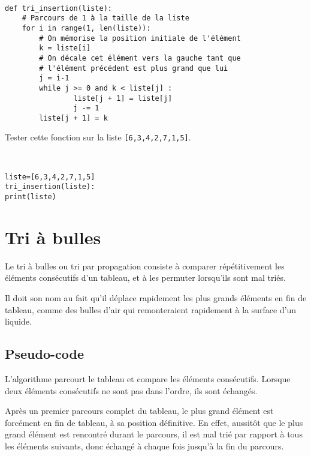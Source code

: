 \begin{solution}~\\
\vspace{-0.7cm}
\begin{verbatim}
def tri_insertion(liste): 
    # Parcours de 1 à la taille de la liste
    for i in range(1, len(liste)):
        # On mémorise la position initiale de l'élément
        k = liste[i]
        # On décale cet élément vers la gauche tant que
        # l'élément précédent est plus grand que lui
        j = i-1
        while j >= 0 and k < liste[j] : 
                liste[j + 1] = liste[j] 
                j -= 1
        liste[j + 1] = k
\end{verbatim}    
\end{solution}

\begin{exercice}
Tester cette fonction sur la liste \verb?[6,3,4,2,7,1,5]?.
\end{exercice}

\begin{solution}~\\
\vspace{-0.7cm}
\begin{verbatim}
liste=[6,3,4,2,7,1,5]
tri_insertion(liste): 
print(liste)
\end{verbatim}    
\end{solution}

\section{Tri à bulles}

Le tri à bulles ou tri par propagation consiste à comparer répétitivement les éléments consécutifs d'un tableau, et à les permuter lorsqu'ils sont mal triés. 

Il doit son nom au fait qu'il déplace rapidement les plus grands éléments en fin de tableau, comme des bulles d'air qui remonteraient rapidement à la surface d'un liquide. 

\subsection{Pseudo-code}

L'algorithme parcourt le tableau et compare les éléments consécutifs. Lorsque deux éléments consécutifs ne sont pas dans l'ordre, ils sont échangés.

Après un premier parcours complet du tableau, le plus grand élément est forcément en fin de tableau, à sa position définitive. En effet, aussitôt que le plus grand élément est rencontré durant le parcours, il est mal trié par rapport à tous les éléments suivants, donc échangé à chaque fois jusqu'à la fin du parcours.

